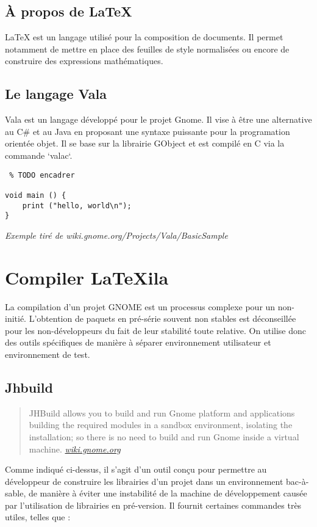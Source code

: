 \documentclass[a4paper,11pt]{report}
\begin{document}
\subsection{À propos de \LaTeX}
LaTeX est un langage utilisé pour la composition de documents. Il permet notamment de mettre en place des feuilles de style normalisées ou encore de construire des expressions mathématiques.

\subsection{Le langage Vala}
\label{sub:vala}
Vala est un langage développé pour le projet Gnome. Il vise à être une alternative au C\# et au Java en proposant une syntaxe puissante pour la programation orientée objet.
Il se base sur la librairie GObject et est compilé en C via la commande `valac`.
\begin{lstlisting} % TODO encadrer

void main () {
    print ("hello, world\n");
}

\end{lstlisting}\textit{Exemple tiré de wiki.gnome.org/Projects/Vala/BasicSample}

\section{Compiler LaTeXila}
\label{cha:compiler}
La compilation d'un projet GNOME est un processus complexe pour un non-initié. L'obtention de paquets en pré-série souvent non stables est déconseillée pour les non-développeurs du fait de leur stabilité toute relative. On utilise donc des outils spécifiques de manière à séparer environnement utilisateur et environnement de test. 

\subsection{Jhbuild}
\label{sub:jhbuild}

\begin{quote}
JHBuild allows you to build and run Gnome platform and applications building the required modules in a sandbox environment, isolating the installation; so there is no need to build and run Gnome inside a virtual machine. \textit{\url{wiki.gnome.org}}
\end{quote}

Comme indiqué ci-dessus, il s'agit d'un outil conçu pour permettre au développeur de construire les librairies d'un projet dans un environnement bac-à-sable, de manière à éviter une instabilité de la machine de développement causée par l'utilisation de librairies en pré-version. Il fournit certaines commandes très utiles, telles que :
\end{document}
